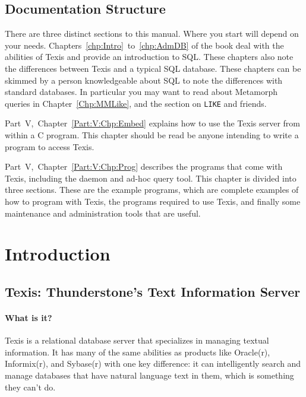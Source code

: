 \section{Documentation Structure}

There are three distinct sections to this manual.  Where you start
will depend on your needs. Chapters~\ref{chp:Intro}~to~\ref{chp:AdmDB}
of the book deal with the abilities of Texis and provide an
introduction to SQL.  These chapters also note the differences between
Texis and a typical SQL database.  These chapters can be skimmed by a
person knowledgeable about SQL to note the differences with standard
databases.  In particular you may want to read about Metamorph queries
in Chapter~\ref{Chp:MMLike}, and the section on \verb|LIKE| and
friends.

Part~V,~Chapter~\ref{Part:V:Chp:Embed} explains how to use the Texis server from
within a C program.  This chapter should be read be anyone intending
to write a program to access Texis.

Part~V,~Chapter~\ref{Part:V:Chp:Prog} describes the programs that come with Texis,
including the daemon and ad-hoc query tool.  This chapter is divided
into three sections.  These are the example programs, which are
complete examples of how to program with Texis, the programs required
to use Texis, and finally some maintenance and administration tools
that are useful.


\chapter{Introduction}{\label{chp:Intro}}

\section{Texis: Thunderstone's Text Information Server}

\subsubsection{What is it?}

Texis is a relational database server that specializes in managing
textual information.  It has many of the same abilities as products
like Oracle(r), Informix(r), and Sybase(r) with one key difference:
it can intelligently search and manage databases that have natural
language text in them, which is something they can't do.

